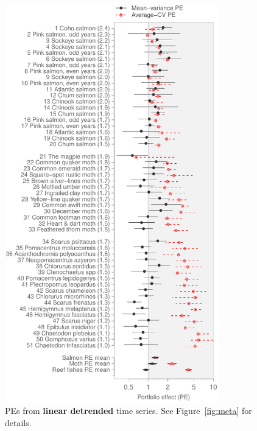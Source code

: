 \begin{figure}[htbp]
  \centering
  \includegraphics[height=6.8in]{prophets/PE_comparison_z_meta_detrend_taxa_20121214.pdf}
  \caption{PEs from \textbf{linear detrended} time series. See
    Figure~\ref{fig:meta} for details.
}
\label{fig:meta-detrend}
\end{figure}

